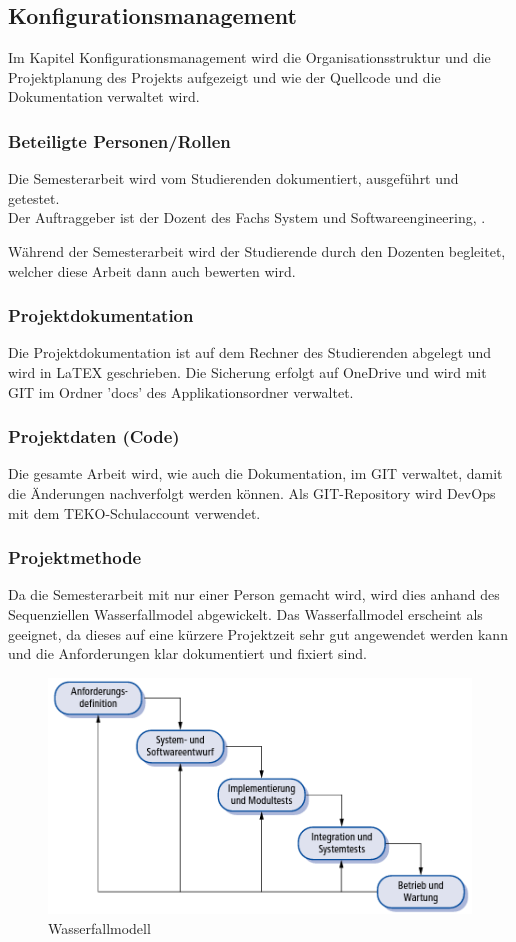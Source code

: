 \subsection{Konfigurationsmanagement}
Im Kapitel Konfigurationsmanagement wird die Organisationsstruktur und die Projektplanung des Projekts aufgezeigt und wie der Quellcode und die Dokumentation verwaltet wird.

\subsubsection{Beteiligte Personen/Rollen}
Die Semesterarbeit wird vom Studierenden dokumentiert, ausgeführt und getestet.\\
Der Auftraggeber ist der Dozent des Fachs System und Softwareengineering, \gutachter.

Während der Semesterarbeit wird der Studierende durch den Dozenten \gutachter begleitet, welcher diese Arbeit dann auch bewerten wird.

\subsubsection{Projektdokumentation}
Die Projektdokumentation ist auf dem Rechner des Studierenden abgelegt und wird in LaTEX geschrieben. Die Sicherung erfolgt auf OneDrive und wird mit GIT im Ordner 'docs' des Applikationsordner verwaltet. 

\subsubsection{Projektdaten (Code)}
Die gesamte Arbeit wird, wie auch die Dokumentation, im GIT verwaltet, damit die Änderungen nachverfolgt werden können. Als GIT-Repository wird DevOps mit dem TEKO-Schulaccount verwendet.

\subsubsection{Projektmethode}
Da die Semesterarbeit mit nur einer Person gemacht wird, wird dies anhand des Sequenziellen Wasserfallmodel abgewickelt. Das Wasserfallmodel erscheint als geeignet, da dieses auf eine kürzere Projektzeit sehr gut angewendet werden kann und die Anforderungen klar dokumentiert und fixiert sind.

\begin{figure}[htp]
    \begin{center}
        \includegraphics[width=0.5\linewidth]{content/images/wasserfallmodell.png}
        \caption{Wasserfallmodell}
        \label{fig:wasserfallmodell}
      \end{center}
\end{figure}

